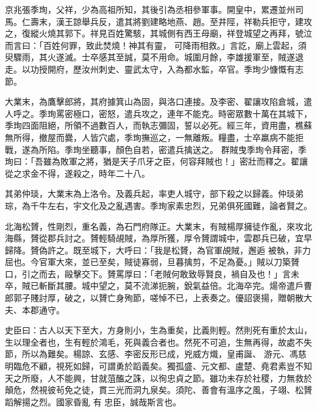 \begin{pinyinscope}
 京兆張季珣，父祥，少為高祖所知，其後引為丞相參軍事。開皇中，累遷並州司馬。仁壽末，漢王諒舉兵反，遣其將劉建略地燕、趙。至井陘，祥勒兵拒守，建攻之，復縱火燒其郭下。祥見百姓驚駭，其城側有西王母廟，祥登城望之再拜，號泣而言曰：「百姓何罪，致此焚燒！神其有靈，
 可降雨相救。」言訖，廟上雲起，須臾驟雨，其火遂滅。士卒感其至誠，莫不用命。城圍月餘，李雄援軍至，賊遂退走。以功授開府，歷汝州刺史、靈武太守，入為都水監，卒官。季珣少慷慨有志節。



 大業末，為鷹擊郎將，其府據箕山為固，與洛口連接。及李密、翟讓攻陷倉城，遣人呼之。季珣罵密極口，密怒，遣兵攻之，連年不能克。時密眾數十萬在其城下，季珣四面阻絕，所領不過數百人，而執志彌固，誓以必死。經三年，資用盡，樵蘇無所得，撤屋而爨，人皆穴處，季珣撫巡之，一無離叛。糧盡，士卒羸病不能拒戰，遂為所陷。季珣坐聽事，顏色自若，密遣兵擒送之。
 群賊曳季珣令拜密，季珣曰：「吾雖為敗軍之將，猶是天子爪牙之臣，何容拜賊也！」密壯而釋之。翟讓從之求金不得，遂殺之，時年二十八。



 其弟仲琰，大業末為上洛令。及義兵起，率吏人城守，部下殺之以歸義。仲琰弟琮，為千牛左右，宇文化及之亂遇害。季珣家素忠烈，兄弟俱死國難，論者賢之。



 北海松贇，性剛烈，重名義，為石門府隊正。大業末，有賊楊厚擁徒作亂，來攻北海縣，贇從郡兵討之。贇輕騎覘賊，為厚所獲，厚令贇謂城中，雲郡兵已破，宜早歸降。贇偽許之。既至城下，大呼曰：「我是松贇，為官軍覘賊，邂逅
 被執，非力屈也。今官軍大來，並已至矣，賊徒寡弱，旦暮擒剪，不足為憂。」賊以刀築贇口，引之而去，毆擊交下。贇罵厚曰：「老賊何敢致辱賢良，禍自及也！」言未卒，賊已斬斷其腰。城中望之，莫不流涕扼腕，銳氣益倍。北海卒完。煬帝遣戶曹郎郭子賤討厚，破之，以贇亡身殉節，嗟悼不已，上表奏之。優詔褒揚，贈朝散大夫、本郡通守。



 史臣曰：古人以天下至大，方身則小，生為重矣，比義則輕。然則死有重於太山，生以理全者也，生有輕於鴻毛，死與義合者也。然死不可追，生無再得，故處不失節，所以為難矣。楊諒、玄感、李密反形已成，兇威方熾，皇甫誕、
 游元、馮慈明臨危不顧，視死如歸，可謂勇於蹈義矣。獨孤盛、元文都、盧楚、堯君素豈不知天之所廢，人不能興，甘就菹醢之誅，以徇忠貞之節。雖功未存於社稷，力無救於顛危，然視彼茍免之徒，貫三光而洞九泉矣。須陀、善會有溫序之風，子翊、松贇蹈解揚之烈。國家昏亂
 有
 忠臣，誠哉斯言也。



\end{pinyinscope}